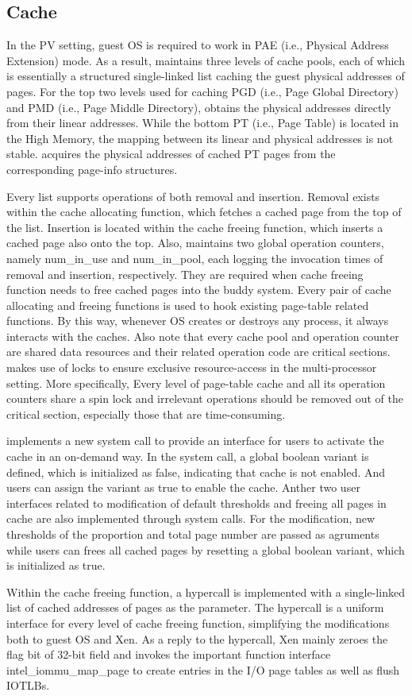 \subsection{\name Cache}

In the PV setting, guest OS is required to work in PAE (i.e., Physical Address Extension) mode. As a result, \name maintains three levels of cache pools, each of which is essentially a structured single-linked list caching the guest physical addresses of pages. For the top two levels used for caching PGD (i.e., Page Global Directory) and PMD (i.e., Page Middle Directory), \name obtains the physical addresses directly from their linear addresses. While the bottom PT (i.e., Page Table) is located in the High Memory, the mapping between its linear and physical addresses is not stable. \name acquires the physical addresses of cached PT pages from the corresponding page-info structures.

Every list supports operations of both removal and insertion. Removal exists within the cache allocating function, which fetches a cached page from the top of the list. Insertion is located within the cache freeing function, which inserts a cached page also onto the top. Also, \name maintains two global operation counters, namely num\_in\_use and num\_in\_pool, each logging the invocation times of removal and insertion, respectively. They are required when cache freeing function needs to free cached pages into the buddy system. Every pair of cache allocating and freeing functions is used to hook existing page-table related functions. By this way, whenever OS creates or destroys any process, it always interacts with the caches. Also note that every cache pool and operation counter are shared data resources and their related operation code are critical sections. \name makes use of locks to ensure exclusive resource-access in the multi-processor setting. More specifically, Every level of page-table cache and all its operation counters share a spin lock and irrelevant operations should be removed out of the critical section, especially those that are time-consuming.

\name implements a new system call to provide an interface for users to activate the cache in an on-demand way. In the system call, a global boolean variant is defined, which is initialized as false, indicating that cache is not enabled. And users can assign the variant as true to enable the cache. Anther two user interfaces related to modification of default thresholds and freeing all pages in cache are also implemented through system calls. For the modification, new thresholds of the proportion and total page number are passed as agruments while users can frees all cached pages by resetting a global boolean variant, which is initialized as true.

Within the cache freeing function, a hypercall is implemented with a single-linked list of cached addresses of pages as the parameter. The hypercall is a uniform interface for every level of cache freeing function, simplifying the modifications both to guest OS and Xen. As a reply to the hypercall, Xen mainly zeroes the flag bit of 32-bit field and invokes the important function interface intel\_iommu\_map\_page to create entries in the I/O page tables as well as flush IOTLBs.

